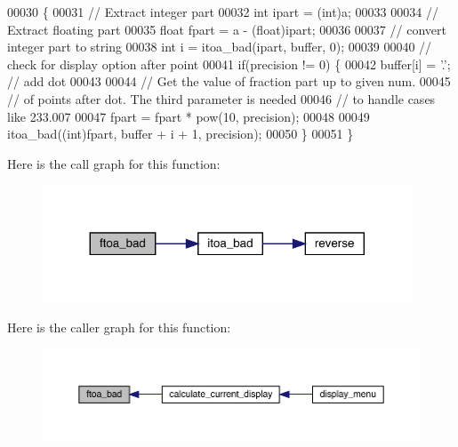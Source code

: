 \begin{DoxyCode}
00030                                                     \{
00031   \textcolor{comment}{// Extract integer part}
00032   \textcolor{keywordtype}{int} ipart = (int)a;
00033 
00034   \textcolor{comment}{// Extract floating part}
00035   \textcolor{keywordtype}{float} fpart = a - (float)ipart;
00036 
00037   \textcolor{comment}{// convert integer part to string}
00038   \textcolor{keywordtype}{int} i = itoa_bad(ipart, buffer, 0);
00039 
00040   \textcolor{comment}{// check for display option after point}
00041   \textcolor{keywordflow}{if}(precision != 0) \{
00042     buffer[i] = \textcolor{charliteral}{'.'};  \textcolor{comment}{// add dot}
00043 
00044     \textcolor{comment}{// Get the value of fraction part up to given num.}
00045     \textcolor{comment}{// of points after dot. The third parameter is needed}
00046     \textcolor{comment}{// to handle cases like 233.007}
00047     fpart = fpart * pow(10, precision);
00048 
00049     itoa_bad((\textcolor{keywordtype}{int})fpart, buffer + i + 1, precision);
00050   \}
00051 \}
\end{DoxyCode}
Here is the call graph for this function\+:\nopagebreak
\begin{figure}[H]
\begin{center}
\leavevmode
\includegraphics[width=311pt]{vlib_8h_a8805990ed667939e615e4a98950b8bd1_cgraph}
\end{center}
\end{figure}
Here is the caller graph for this function\+:\nopagebreak
\begin{figure}[H]
\begin{center}
\leavevmode
\includegraphics[width=350pt]{vlib_8h_a8805990ed667939e615e4a98950b8bd1_icgraph}
\end{center}
\end{figure}
\mbox{\label{vlib_8h_a08fa7134f8b9a80eeba25f9feab22892}} 
